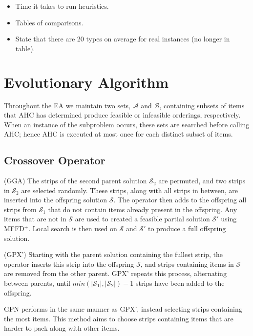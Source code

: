 \documentclass{elsarticle}
\begin{document}
\begin{itemize}
	\item Time it takes to run heuristics.
	\item Tables of comparisons.
	\item State that there are 20 types on average for real instances (no longer in table).
\end{itemize}


\section{Evolutionary Algorithm}
\label{sec:ea}
Throughout the EA we maintain two sets, $\mathcal{A}$ and $\mathcal{B}$, containing subsets of items that AHC has determined produce feasible or infeasible orderings, respectively. When an instance of the subproblem occurs, these sets are searched before calling AHC; hence AHC is executed at most once for each distinct subset of items.


\subsection{Crossover Operator}
\label{sub:xover}
(GGA) The strips of the second parent solution $\mathcal{S}_2$ are permuted, and two strips in $\mathcal{S}_2$ are selected randomly. These strips, along with all strips in between, are inserted into the offspring solution $\mathcal{S}$. The operator then adds to the offspring all strips from $\mathcal{S}_1$ that do not contain items already present in the offspring. Any items that are not in $\mathcal{S}$ are used to created a feasible partial solution $\mathcal{S}'$ using MFFD$^+$. Local search is then used on $\mathcal{S}$ and $\mathcal{S}'$ to produce a full offspring solution.

(GPX') Starting with the parent solution containing the fullest strip, the operator inserts this strip into the offspring $\mathcal{S}$, and strips containing items in $\mathcal{S}$ are removed from the other parent. GPX' repeats this process, alternating between parents, until $min (|\mathcal{S}_1|,|\mathcal{S}_2|) - 1$ strips have been added to the offspring.

GPN performs in the same manner as GPX', instead selecting strips containing the most items. This method aims to choose strips containing items that are harder to pack along with other items.
\end{document}
